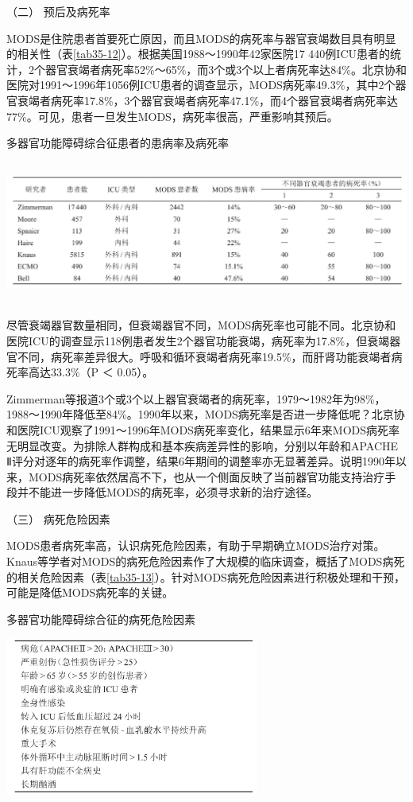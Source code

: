 \hypertarget{text00094.htmlux5cux23CHP3-11-3-5-2}{}
（二） 预后及病死率

MODS是住院患者首要死亡原因，而且MODS的病死率与器官衰竭数目具有明显的相关性（表\ref{tab35-12}）。根据美国1988～1990年42家医院17
440例ICU患者的统计，2个器官衰竭者病死率52\%～65\%，而3个或3个以上者病死率达84\%。北京协和医院对1991～1996年1056例ICU患者的调查显示，MODS病死率49.3\%，其中2个器官衰竭者病死率17.8\%，3个器官衰竭者病死率47.1\%，而4个器官衰竭者病死率达77\%。可见，患者一旦发生MODS，病死率很高，严重影响其预后。

\begin{table}[htbp]
\centering
\caption{多器官功能障碍综合征患者的患病率及病死率}
\label{tab35-12}
\includegraphics[width=6.64583in,height=1.84375in]{./images/Image00144.jpg}
\end{table}

尽管衰竭器官数量相同，但衰竭器官不同，MODS病死率也可能不同。北京协和医院ICU的调查显示118例患者发生2个器官功能衰竭，病死率为17.8\%，但衰竭器官不同，病死率差异很大。呼吸和循环衰竭者病死率19.5\%，而肝肾功能衰竭者病死率高达33.3\%（P
＜ 0.05）。

Zimmerman等报道3个或3个以上器官衰竭者的病死率，1979～1982年为98\%，1988～1990年降低至84\%。1990年以来，MODS病死率是否进一步降低呢？北京协和医院ICU观察了1991～1996年MODS病死率变化，结果显示6年来MODS病死率无明显改变。为排除人群构成和基本疾病差异性的影响，分别以年龄和APACHE
Ⅱ评分对逐年的病死率作调整，结果6年期间的调整率亦无显著差异。说明1990年以来，MODS病死率依然居高不下，也从一个侧面反映了当前器官功能支持治疗手段并不能进一步降低MODS的病死率，必须寻求新的治疗途径。

\hypertarget{text00094.htmlux5cux23CHP3-11-3-5-3}{}
（三） 病死危险因素

MODS患者病死率高，认识病死危险因素，有助于早期确立MODS治疗对策。Knaus等学者对MODS的病死危险因素作了大规模的临床调查，概括了MODS病死的相关危险因素（表\ref{tab35-13}）。针对MODS病死危险因素进行积极处理和干预，可能是降低MODS病死率的关键。

\begin{table}[htbp]
\centering
\caption{多器官功能障碍综合征的病死危险因素}
\label{tab35-13}
\includegraphics[width=3.29167in,height=2.0625in]{./images/Image00145.jpg}
\end{table}

